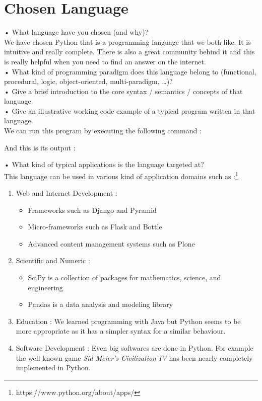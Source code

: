 \section{Chosen Language}
•	What language have you chosen (and why)?\\
We have chosen Python that is a programming language that we both like. It is intuitive and really complete. There is also a great community behind it and this is really helpful when you need to find an answer on the internet.\\
•	What kind of programming paradigm does this language belong to (functional, procedural, logic, object-oriented, multi-paradigm, …)?\\
•	Give a brief introduction to the core syntax / semantics / concepts of that language.\\
•	Give an illustrative working code example of a typical program written in that language.\\



We can run this program by executing the following command :



And this is its output :


•	What kind of typical applications is the language targeted at?\\
This language can be used in various kind of application domains such as :\footnote{https://www.python.org/about/apps/}
\begin{enumerate}
    \item{Web and Internet Development : 
        \begin{itemize}
            \item Frameworks such as Django and Pyramid
            \item Micro-frameworks such as Flask and Bottle
            \item Advanced content management systems such as Plone
        \end{itemize}
    }
    \item{Scientific and Numeric :
        \begin{itemize}
            \item SciPy is a collection of packages for mathematics, science, and engineering
            \item Pandas is a data analysis and modeling library
        \end{itemize}
    
    }
    \item{Education : We learned programming with Java but Python seems to be more appropriate as it has a simpler syntax for a similar behaviour.}
    \item{Software Development : Even big softwares are done in Python. For example the well known game \emph{Sid Meier's Civilization IV} has been nearly completely implemented in Python.}
\end{enumerate}